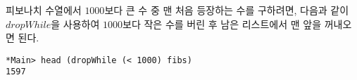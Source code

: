 피보나치 수열에서 $1000$보다 큰 수 중 맨 처음 등장하는 수를 구하려면, 다음과
같이 $dropWhile$을 사용하여 $1000$보다 작은 수를 버린 후 남은 리스트에서 맨
앞을 꺼내오면 된다.
\begin{lstlisting}
*Main> head (dropWhile (< 1000) fibs)
1597
\end{lstlisting}




